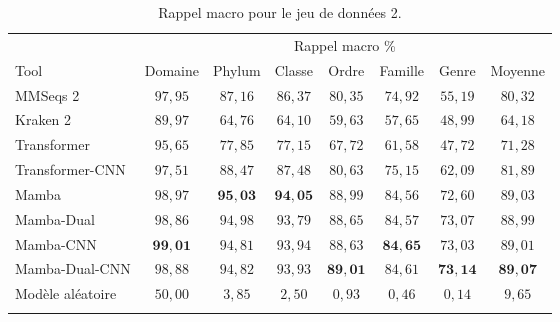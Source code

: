\begin{table}[hbt!]
\centering
\caption{
    Rappel macro pour le jeu de données 2.
}
\begin{tabular}{lccccccc} \hline
       & \multicolumn{7}{c}{Rappel macro \%}       \\ \cmidrule(lr){2-8}
Tool             & Domaine  & Phylum  & Classe & Ordre & Famille & Genre & Moyenne \\ \hline
MMSeqs 2         & $97,95$ & $87,16$ & $86,37$ & $80,35$ & $74,92$ & $55,19$ & $80,32$ \\
Kraken 2         & $89,97$ & $64,76$ & $64,10$ & $59,63$ & $57,65$ & $48,99$ & $64,18$ \\
Transformer      & $95,65$ & $77,85$ & $77,15$ & $67,72$ & $61,58$ & $47,72$ & $71,28$ \\
Transformer-CNN  & $97,51$ & $88,47$ & $87,48$ & $80,63$ & $75,15$ & $62,09$ & $81,89$ \\
Mamba            & $\mathit{98,97}$ & $\mathbf{95,03}$ & $\mathbf{94,05}$ & $\mathit{88,99}$ & $84,56$ & $72,60$ & $\mathit{89,03}$ \\
Mamba-Dual       & $98,86$ & $\mathit{94,98}$ & $93,79$ & $88,65$ & $84,57$ & $\mathit{73,07}$ & $88,99$ \\
Mamba-CNN        & $\mathbf{99,01}$ & $94,81$ & $\mathit{93,94}$ & $88,63$ & $\mathbf{84,65}$ & $73,03$ & $89,01$ \\
Mamba-Dual-CNN   & $98,88$ & $94,82$ & $93,93$ & $\mathbf{89,01}$ & $\mathit{84,61}$ & $\mathbf{73,14}$ & $\mathbf{89,07}$ \\
\hline
Modèle aléatoire & $50,00$ & $3,85$  & $2,50$  & $0,93$ & $0,46$ & $0,14$  & $9,65$ \\
\hline
\label{tab:2_r}
\end{tabular}
\end{table}

